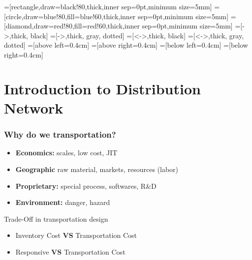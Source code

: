\documentclass[10pt,handout,notes=show]{beamer}
\begin{document}
\usetikzlibrary{shapes}
=[rectangle,draw=black!80,thick,inner sep=0pt,minimum size=5mm]
=[circle,draw=blue!80,fill=blue!60,thick,inner sep=0pt,minimum size=5mm]
=[diamond,draw=red!80,fill=red!60,thick,inner sep=0pt,minimum size=5mm]
=[->,thick, black]
=[->,thick, gray, dotted]
=[<->,thick, black]
=[<->,thick, gray, dotted]
=[above left=0.4cm]
=[above right=0.4cm]
=[below left=0.4cm]
=[below right=0.4cm]

\section[Network 101]{Introduction to Distribution Network}
\begin{frame}

  \frametitle{Why do we transportation?}
  \begin{itemize}
    \item \textbf{Economics:} scales, low cost, JIT
    \item \textbf{Geographic} raw material, markets, resources (labor)
    \item \textbf{Proprietary:} special process, softwares, R\&D
    \item \textbf{Environment:} danger, hazard
  \end{itemize}

  \NextLine
  \begin{alertblock}{\small{Trade-Off in transportation design}}{}
    \begin{center}
    \begin{itemize}
      \item Inventory Cost \textbf{VS} Transportation Cost
      \item Responsive \textbf{VS} Transportation Cost
    \end{itemize}
    \end{center}
  \end{alertblock}

 \end{frame}
\end{document}
